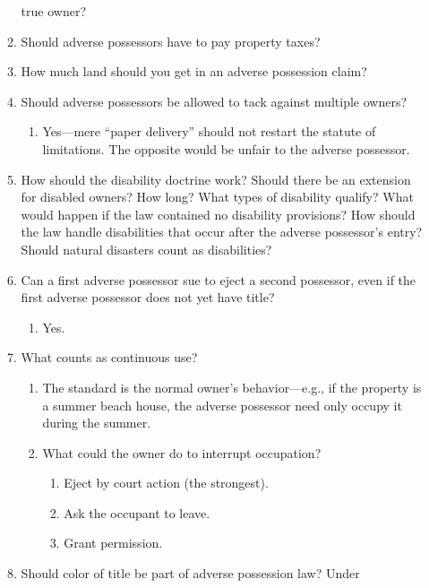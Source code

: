 \begin{enumerate}
\begin{enumerate}
        true owner?
        \item Should adverse possessors have to pay property taxes?
        \item How much land should you get in an adverse possession claim?
        \item Should adverse possessors be allowed to tack against multiple 
        owners?
        \begin{enumerate}
            \item Yes---mere ``paper delivery'' should not restart the statute 
            of limitations. The opposite would be unfair to the adverse 
            possessor.
        \end{enumerate}
        \item How should the disability doctrine work? Should there be an 
        extension for disabled owners? How long? What types of disability 
        qualify? What would happen if the law contained no disability 
        provisions? How should the law handle disabilities that occur after the 
        adverse possessor's entry? Should natural disasters count as 
        disabilities?
        \item Can a first adverse possessor sue to eject a second possessor, 
        even if the first adverse possessor does not yet have title?
        \begin{enumerate}
            \item Yes.
        \end{enumerate}
        \item What counts as continuous use?
        \begin{enumerate}
            \item The standard is the normal owner's behavior---e.g., if the 
            property is a summer beach house, the adverse possessor need only 
            occupy it during the summer.
            \item What could the owner do to interrupt occupation?
            \begin{enumerate}
                \item Eject by court action (the strongest).
                \item Ask the occupant to leave.
                \item Grant permission.
            \end{enumerate}
        \end{enumerate}
        \item Should color of title be part of adverse possession law? Under 

\end{enumerate}
\end{enumerate}
